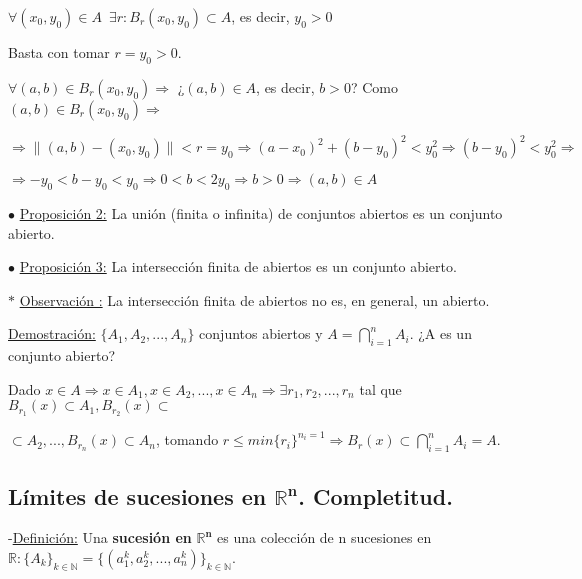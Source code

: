 \documentclass[10pt, titlepage]{article}
\newcommand{\R}{\mathbb{R}}
\newcommand{\N}{\mathbb{N}}
\newcommand{\spac}{\, \, \,}
\newcommand{\definicion}{\noindent-\underline{Definición:} }
\newcommand{\proposicion}[1][\!\!]{\noindent$\bullet$ \underline{Proposición #1:} }
\newcommand{\observacion}[1][\!\!]{\noindent$\ast$ \underline{Observación #1:} }
\newcommand{\dindent}{\indent\indent}
\begin{document}
$\forall (x_0, y_0) \in A \spac \exists r : B_r(x_0, y_0) \subset A$, es decir, $y_0 > 0$

Basta con tomar $r = y_0 > 0$.
\vspace{3mm}

$\forall (a, b) \in B_r(x_0, y_0) \Rightarrow$ ¿$(a, b) \in A$, es decir, $b>0$?
Como $ (a, b) \in B_r(x_0, y_0) \Rightarrow$

$\Rightarrow \|(a, b) - (x_0, y_0)\| < r = y_0 \Rightarrow (a - x_0)^2 + (b - y_0)^2 < y_0^2 \Rightarrow 
(b - y_0)^2 < y_0 ^2 \Rightarrow$

$\Rightarrow -y_0 < b-y_0 < y_0 \Rightarrow 0< b < 2 y_0 \Rightarrow b > 0 \Rightarrow (a, b) \in A$
\vspace{5mm}

\proposicion[2] La unión (finita o infinita) de conjuntos abiertos es un conjunto abierto.
\vspace{5mm}

\proposicion[3] La intersección finita de abiertos es un conjunto abierto.
\vspace{5mm}

\observacion La intersección finita de abiertos no es, en general, un abierto.
\vspace{3mm}

\underline{Demostración:} $\{A_1, A_2,..., A_n\}$ conjuntos abiertos y $A = \displaystyle \bigcap_{i = 1}^n A_i$.  ¿A es un conjunto abierto? 

\dindent Dado $x \in A \Rightarrow x \in A_1, x \in A_2,..., x \in A_n \Rightarrow \exists r_1, r_2,..., r_n$ tal que $ B_{r_1}(x) \subset  A_1, B_{r_2}(x) \subset$

\dindent $\subset A_2,..., B_{r_n}(x) \subset A_n$, tomando $r \leq min \{r_i\}^{n_i=1} \Rightarrow B_r(x) 
\subset \displaystyle \bigcap_{i = 1}^n A_i = A$.
\vspace{3mm}



\subsection{Límites de sucesiones en $\mathbf{\R^n}$. Completitud.}
\vspace{3mm}

\definicion Una \textbf{sucesión en} $\mathbf{\R^n}$ es una colección de n sucesiones en $\R 
: \{A_k\}_{k \in \N} = \{(a_1^k, a_2^k,..., a_n^k)\}_{k \in \N}$.
\vspace{3mm}
\end{document}
